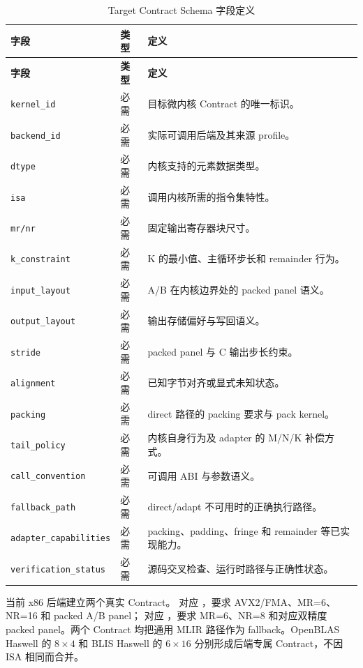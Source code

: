 \begingroup
\small
\begin{longtable}{@{}p{}p{}p{}@{}}
  \caption{Target Contract Schema 字段定义}\label{tab:chapter3-contract-schema}\\
  \toprule
  \textbf{字段} & \textbf{类型} & \textbf{定义} \\
  \midrule
  \endfirsthead
  \toprule
  \textbf{字段} & \textbf{类型} & \textbf{定义} \\
  \midrule
  \endhead
  \texttt{kernel\_id} & 必需 & 目标微内核 Contract 的唯一标识。 \\
  \texttt{backend\_id} & 必需 & 实际可调用后端及其来源 profile。 \\
  \texttt{dtype} & 必需 & 内核支持的元素数据类型。 \\
  \texttt{isa} & 必需 & 调用内核所需的指令集特性。 \\
  \texttt{mr/nr} & 必需 & 固定输出寄存器块尺寸。 \\
  \texttt{k\_constraint} & 必需 & K 的最小值、主循环步长和 remainder 行为。 \\
  \texttt{input\_layout} & 必需 & A/B 在内核边界处的 packed panel 语义。 \\
  \texttt{output\_layout} & 必需 & 输出存储偏好与写回语义。 \\
  \texttt{stride} & 必需 & packed panel 与 C 输出步长约束。 \\
  \texttt{alignment} & 必需 & 已知字节对齐或显式未知状态。 \\
  \texttt{packing} & 必需 & direct 路径的 packing 要求与 pack kernel。 \\
  \texttt{tail\_policy} & 必需 & 内核自身行为及 adapter 的 M/N/K 补偿方式。 \\
  \texttt{call\_convention} & 必需 & 可调用 ABI 与参数语义。 \\
  \texttt{fallback\_path} & 必需 & direct/adapt 不可用时的正确执行路径。 \\
  \texttt{adapter\_capabilities} & 必需 & packing、padding、fringe 和 remainder 等已实现能力。 \\
  \texttt{verification\_status} & 必需 & 源码交叉检查、运行时路径与正确性状态。 \\
  \bottomrule
\end{longtable}
\endgroup

当前 x86 后端建立两个真实 Contract。 对应 ，要求 AVX2/FMA、MR=6、NR=16 和 packed A/B panel； 对应 ，要求 MR=6、NR=8 和对应双精度 packed panel。两个 Contract 均把通用 MLIR 路径作为 fallback。OpenBLAS Haswell 的 $8\times4$ 和 BLIS Haswell 的 $6\times16$ 分别形成后端专属 Contract，不因 ISA 相同而合并。


